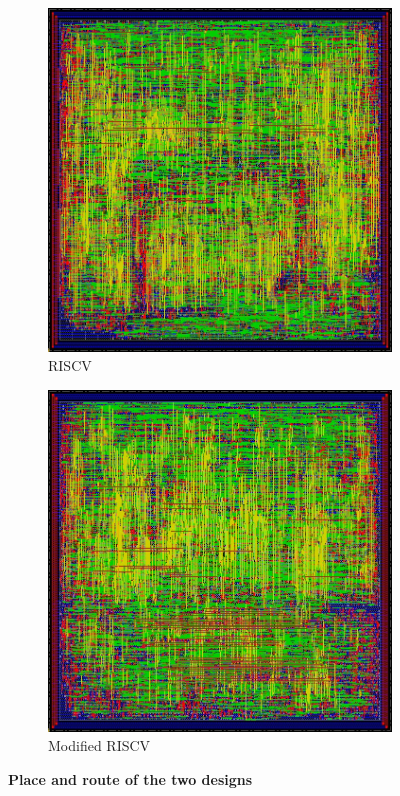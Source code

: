 \begin{figure}[!h]
    \centering
    \begin{subfigure}[b]{0.45\linewidth}
      \includegraphics[width=\linewidth]{chapters/chap6images/riscv.jpg}
      \caption{RISCV}
    \end{subfigure}
    \begin{subfigure}[b]{0.452\linewidth}
      \includegraphics[width=\linewidth]{chapters/chap6images/riscv_abs.jpg}
      \caption{Modified RISCV}
    \end{subfigure}
    \caption{\textbf{Place and route of the two designs}}
    \label{fig:placeroute}
\end{figure}